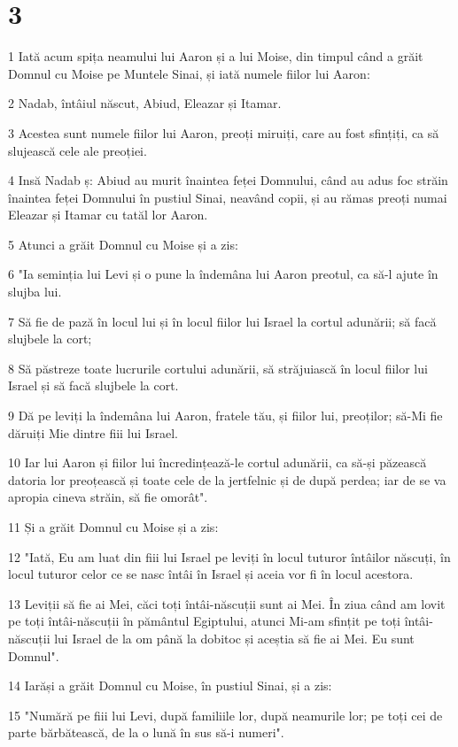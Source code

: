 \chapter{3}

\par 1 Iată acum spița neamului lui Aaron și a lui Moise, din timpul când a grăit Domnul cu Moise pe Muntele Sinai, și iată numele fiilor lui Aaron:
\par 2 Nadab, întâiul născut, Abiud, Eleazar și Itamar.
\par 3 Acestea sunt numele fiilor lui Aaron, preoți miruiți, care au fost sfințiți, ca să slujească cele ale preoției.
\par 4 Insă Nadab ș: Abiud au murit înaintea feței Domnului, când au adus foc străin înaintea feței Domnului în pustiul Sinai, neavând copii, și au rămas preoți numai Eleazar și Itamar cu tatăl lor Aaron.
\par 5 Atunci a grăit Domnul cu Moise și a zis:
\par 6 "Ia seminția lui Levi și o pune la îndemâna lui Aaron preotul, ca să-l ajute în slujba lui.
\par 7 Să fie de pază în locul lui și în locul fiilor lui Israel la cortul adunării; să facă slujbele la cort;
\par 8 Să păstreze toate lucrurile cortului adunării, să străjuiască în locul fiilor lui Israel și să facă slujbele la cort.
\par 9 Dă pe leviți la îndemâna lui Aaron, fratele tău, și fiilor lui, preoților; să-Mi fie dăruiți Mie dintre fiii lui Israel.
\par 10 Iar lui Aaron și fiilor lui încredințează-le cortul adunării, ca să-și păzească datoria lor preoțească și toate cele de la jertfelnic și de după perdea; iar de se va apropia cineva străin, să fie omorât".
\par 11 Și a grăit Domnul cu Moise și a zis:
\par 12 "Iată, Eu am luat din fiii lui Israel pe leviți în locul tuturor întâilor născuți, în locul tuturor celor ce se nasc întâi în Israel și aceia vor fi în locul acestora.
\par 13 Leviții să fie ai Mei, căci toți întâi-născuții sunt ai Mei. În ziua când am lovit pe toți întâi-născuții în pământul Egiptului, atunci Mi-am sfințit pe toți întâi-născuții lui Israel de la om până la dobitoc și aceștia să fie ai Mei. Eu  sunt Domnul".
\par 14 Iarăși a grăit Domnul cu Moise, în pustiul Sinai, și a zis:
\par 15 "Numără pe fiii lui Levi, după familiile lor, după neamurile lor; pe toți cei de parte bărbătească, de la o lună în sus să-i numeri".
